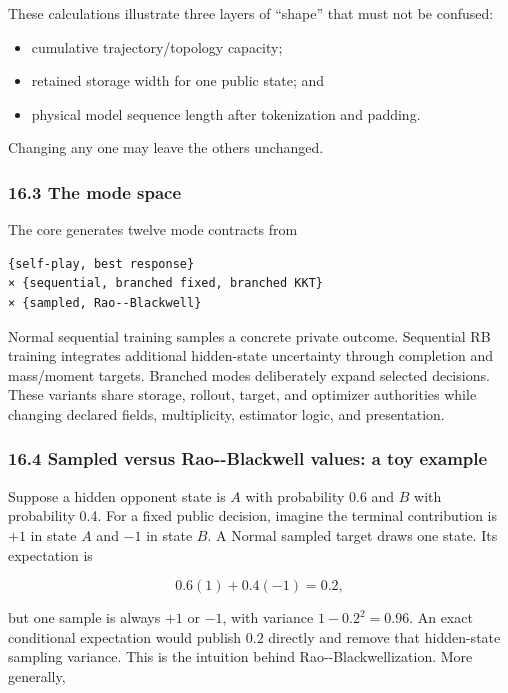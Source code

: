 \documentclass[
  10pt,
  letterpaper,
]{article}
\providecommand{\tightlist}{%
  \setlength{\itemsep}{0pt}\setlength{\parskip}{0pt}}
\begin{document}
These calculations illustrate three layers of ``shape'' that must not be
confused:

\begin{itemize}
\tightlist
\item
  cumulative trajectory/topology capacity;
\item
  retained storage width for one public state; and
\item
  physical model sequence length after tokenization and padding.
\end{itemize}

Changing any one may leave the others unchanged.

\subsubsection{16.3 The mode space}\label{163-the-mode-space}

The core generates twelve mode contracts from

\begin{verbatim}
{self-play, best response}
× {sequential, branched fixed, branched KKT}
× {sampled, Rao--Blackwell}
\end{verbatim}

Normal sequential training samples a concrete private outcome.
Sequential RB training integrates additional hidden-state uncertainty
through completion and mass/moment targets. Branched modes deliberately
expand selected decisions. These variants share storage, rollout,
target, and optimizer authorities while changing declared fields,
multiplicity, estimator logic, and presentation.

\subsubsection{16.4 Sampled versus Rao-\/-Blackwell values: a toy
example}\label{164-sampled-versus-rao--blackwell-values-a-toy-example}

Suppose a hidden opponent state is \(A\) with probability 0.6 and \(B\)
with probability 0.4. For a fixed public decision, imagine the terminal
contribution is \(+1\) in state \(A\) and \(-1\) in state \(B\). A
Normal sampled target draws one state. Its expectation is

\[
0.6(1)+0.4(-1)=0.2,
\]

but one sample is always \(+1\) or \(-1\), with variance
\(1-0.2^2=0.96\). An exact conditional expectation would publish \(0.2\)
directly and remove that hidden-state sampling variance. This is the
intuition behind Rao-\/-Blackwellization. More generally,
\end{document}
